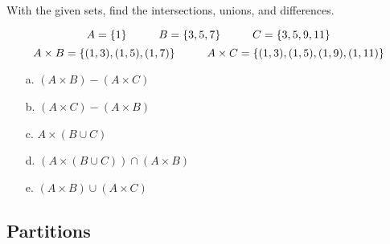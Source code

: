 \documentclass[a4paper,12pt]{book}
\newcounter{question}
\begin{document}
        \begin{questionNOGRADE}{\thequestion}

            With the given sets, find the intersections, unions, and differences.

            $$ A = \{1\} \hspace*{1cm} B = \{3, 5, 7\} \hspace*{1cm} C = \{3, 5, 9, 11\} $$
            $$ A \times B = \{ (1, 3), (1, 5), (1, 7) \} \hspace*{1cm}{}
                A \times C = \{ (1, 3), (1, 5), (1, 9), (1, 11) \} $$

            \begin{enumerate}
                \item[a.]   $(A \times B) - (A \times C)$
                    \solution{}{ { ~\\ \raisebox{0pt}[1cm][0pt]{  } } }

                \item[b.]   $(A \times C) - (A \times B)$
                    \solution{}{ { ~\\ \raisebox{0pt}[1cm][0pt]{  } } }

                \item[c.]   $A \times (B \cup C)$
                    \solution{}{ { ~\\ \raisebox{0pt}[1cm][0pt]{  } } }

                \item[d.]   $(A \times (B \cup C)) \cap (A \times B)$
                    \solution{}{ { ~\\ \raisebox{0pt}[1cm][0pt]{  } } }

                \item[e.]   $(A \times B) \cup (A \times C)$
                    \solution{}{ { ~\\ \raisebox{0pt}[1cm][0pt]{  } } }
            \end{enumerate}

        \end{questionNOGRADE}

    \newpage
    
    \subsection{Partitions}
\end{document}
